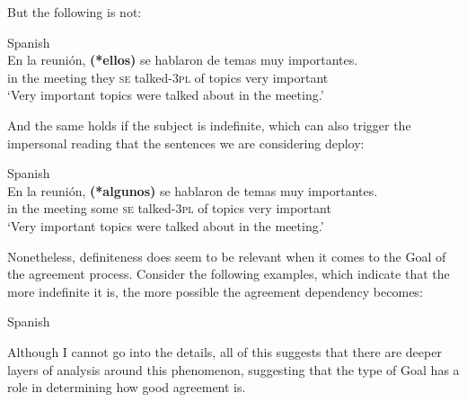 \documentclass[output=paper]{langsci/langscibook}
\begin{document}
But the following is not:

\ea%
    Spanish\label{ex:gallego:40}\\
    \gll En la   reunión, \textbf{(*ellos)}  se   hablaron     de  temas muy importantes.  \\
         in  the  meeting     they   \textsc{se} talked-\textsc{3pl}  of  topics very important\\
    \glt ‘Very important topics were talked about in the meeting.’
    \z

And the same holds if the subject is indefinite, which can also trigger the impersonal reading that the sentences we are considering deploy:

\ea%
    Spanish\label{ex:gallego:41}\\
    \gll En la    reunión, \textbf{(*algunos)} se hablaron   de  temas  muy importantes.\\
         in   the meeting    some     \textsc{se} talked-\textsc{3pl}   of  topics  very important\\
    \glt ‘Very important topics were talked about in the meeting.’
    \z

Nonetheless, definiteness does seem to be relevant when it comes to the Goal of the agreement process. Consider the following examples, which indicate that the more indefinite it is, the more possible the agreement dependency becomes:



\ea%
Spanish
    \label{ex:gallego:42}\\
    \z
\z    

Although I cannot go into the details, all of this suggests that there are deeper layers of analysis around this phenomenon, suggesting that the type of Goal has a role in determining how good agreement is.
\end{document}
